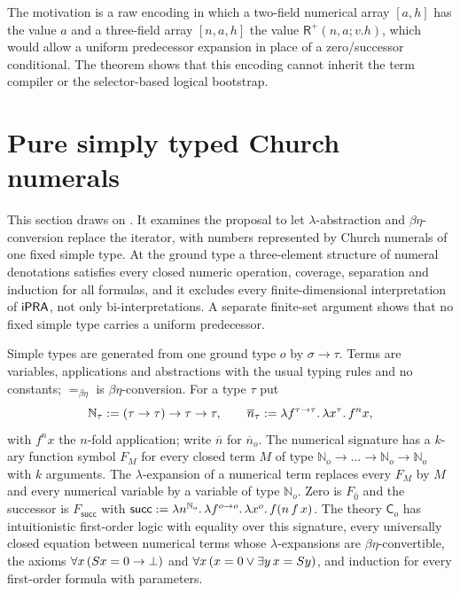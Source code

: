 The motivation is a raw encoding in which a two-field numerical array $[a,h]$
has the value $a$ and a three-field array $[n,a,h]$ the value
$\mathsf{R}^{+}(n,a;v.h)$, which would allow a uniform predecessor expansion in
place of a zero/successor conditional. The theorem shows that this encoding
cannot inherit the term compiler or the selector-based logical bootstrap.

\section{Pure simply typed Church numerals}
\label{obs:sec:church}

This section draws on . It examines the proposal to let
$\lambda$-abstraction and $\beta\eta$-conversion replace the iterator, with
numbers represented by Church numerals of one fixed simple type. At the ground
type a three-element structure of numeral denotations satisfies every closed
numeric operation, coverage, separation and induction for all formulas, and it
excludes every finite-dimensional interpretation of $\mathsf{iPRA}$, not only
bi-interpretations. A separate finite-set argument shows that no fixed simple
type carries a uniform predecessor.

\begin{definition}
\label{obs:def:church}
Simple types are generated from one ground type $o$ by $\sigma\to\tau$. Terms
are variables, applications and abstractions with the usual typing rules and no
constants; $=_{\beta\eta}$ is $\beta\eta$-conversion. For a type $\tau$ put
\[
\mathbb{N}_\tau\mathrel{:=}(\tau\to\tau)\to\tau\to\tau,\qquad
\overline{n}_\tau\mathrel{:=}\lambda f^{\tau\to\tau}.\,\lambda x^{\tau}.\,f^{n}x,
\]
with $f^{n}x$ the $n$-fold application; write $\overline{n}$ for
$\overline{n}_o$. The numerical signature has a $k$-ary function symbol $F_M$
for every closed term $M$ of type
$\mathbb{N}_o\to\dots\to\mathbb{N}_o\to\mathbb{N}_o$ with $k$ arguments. The
$\lambda$-expansion of a numerical term replaces every $F_M$ by $M$ and every
numerical variable by a variable of type $\mathbb{N}_o$. Zero is
$F_{\overline{0}}$ and the successor is $F_{\mathsf{succ}}$ with
$\mathsf{succ}\mathrel{:=}\lambda n^{\mathbb{N}_o}.\,\lambda f^{o\to o}.\,\lambda
x^{o}.\,f(n\,f\,x)$. The theory $\mathsf{C}_o$ has intuitionistic first-order
logic with equality over this signature, every universally closed equation
between numerical terms whose $\lambda$-expansions are $\beta\eta$-convertible,
the axioms $\forall x\,(S x=0\to\bot)$ and
$\forall x\,(x=0\vee\exists y\,x=S y)$, and induction for every first-order
formula with parameters.
\end{definition}

